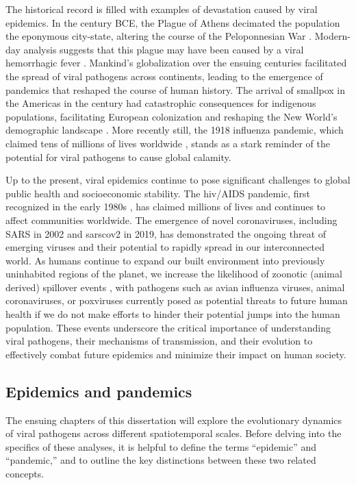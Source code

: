 The historical record is filled with examples of devastation caused by viral epidemics.
In the  century BCE, the Plague of Athens decimated the population the eponymous city-state, altering the course of the Peloponnesian War \citep{thucydides1972history}.
Modern-day analysis suggests that this plague may have been caused by a viral hemorrhagic fever \citep{olson1996thucydides}.
Mankind's globalization over the ensuing centuries facilitated the spread of viral pathogens across continents, leading to the emergence of pandemics that reshaped the course of human history.
The arrival of smallpox in the Americas in the  century \citep{heagerty1928four} had catastrophic consequences for indigenous populations, facilitating European colonization and reshaping the New World's demographic landscape \citep{Patterson2002}.
More recently still, the 1918 influenza pandemic, which claimed tens of millions of lives worldwide \citep{Morens2007}, stands as a stark reminder of the potential for viral pathogens to cause global calamity.

Up to the present, viral epidemics continue to pose significant challenges to global public health and socioeconomic stability.
The \gls{hiv}/AIDS pandemic, first recognized in the early 1980s \citep{Montagnier2002}, has claimed millions of lives and continues to affect communities worldwide.
The emergence of novel coronaviruses, including SARS in 2002 \citep{Zhong2003} and \gls{sarscov2} in 2019, has demonstrated the ongoing threat of emerging viruses and their potential to rapidly spread in our interconnected world.
As humans continue to expand our built environment into previously uninhabited regions of the planet, we increase the likelihood of zoonotic (animal derived) spillover events \citep{Morens2020}, with pathogens such as avian influenza viruses, animal coronaviruses, or poxviruses currently posed as potential threats to future human health if we do not make efforts to hinder their potential jumps into the human population.
These events underscore the critical importance of understanding viral pathogens, their mechanisms of transmission, and their evolution to effectively combat future epidemics and minimize their impact on human society.

\subsection{Epidemics and pandemics}\label{sec:epidemicsVsPandemics}
The ensuing chapters of this dissertation will explore the evolutionary dynamics of viral pathogens across different spatiotemporal scales.
Before delving into the specifics of these analyses, it is helpful to define the terms ``epidemic'' and ``pandemic,'' and to outline the key distinctions between these two related concepts.

